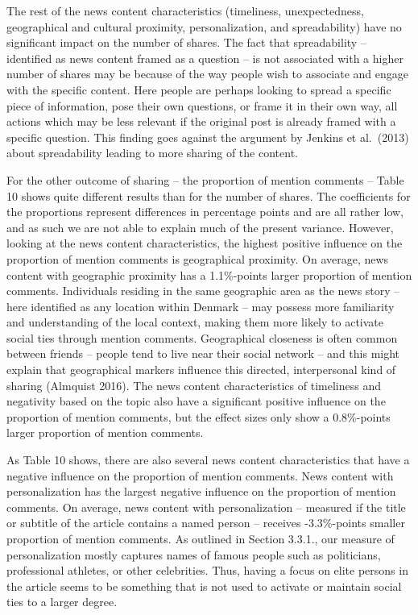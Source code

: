 \documentclass[
]{article}
\begin{document}
The rest of the news content characteristics (timeliness,
unexpectedness, geographical and cultural proximity, personalization,
and spreadability) have no significant impact on the number of shares.
The fact that spreadability -- identified as news content framed as a
question -- is not associated with a higher number of shares may be
because of the way people wish to associate and engage with the specific
content. Here people are perhaps looking to spread a specific piece of
information, pose their own questions, or frame it in their own way, all
actions which may be less relevant if the original post is already
framed with a specific question. This finding goes against the argument
by Jenkins et al.~(2013) about spreadability leading to more sharing of
the content.

\hspace{-2.5em}

\noindent For the other outcome of sharing -- the proportion of mention
comments -- Table 10 shows quite different results than for the number
of shares. The coefficients for the proportions represent differences in
percentage points and are all rather low, and as such we are not able to
explain much of the present variance. However, looking at the news
content characteristics, the highest positive influence on the
proportion of mention comments is geographical proximity. On average,
news content with geographic proximity has a 1.1\%-points larger
proportion of mention comments. Individuals residing in the same
geographic area as the news story -- here identified as any location
within Denmark -- may possess more familiarity and understanding of the
local context, making them more likely to activate social ties through
mention comments. Geographical closeness is often common between friends
-- people tend to live near their social network -- and this might
explain that geographical markers influence this directed, interpersonal
kind of sharing (Almquist 2016). The news content characteristics of
timeliness and negativity based on the topic also have a significant
positive influence on the proportion of mention comments, but the effect
sizes only show a 0.8\%-points larger proportion of mention comments.

As Table 10 shows, there are also several news content characteristics
that have a negative influence on the proportion of mention comments.
News content with personalization has the largest negative influence on
the proportion of mention comments. On average, news content with
personalization -- measured if the title or subtitle of the article
contains a named person -- receives -3.3\%-points smaller proportion of
mention comments. As outlined in Section 3.3.1., our measure of
personalization mostly captures names of famous people such as
politicians, professional athletes, or other celebrities. Thus, having a
focus on elite persons in the article seems to be something that is not
used to activate or maintain social ties to a larger degree.
\end{document}
